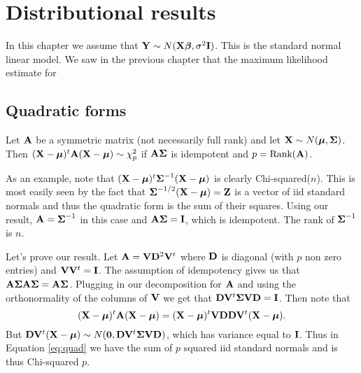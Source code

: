 \chapter{Distributional results}
In this chapter we assume that $\mathbf{Y} \sim N(\mathbf{X} \boldsymbol{\beta}, \sigma^2 \mathbf{I})$. This is the
standard normal linear model. We saw in the previous chapter that the maximum
likelihood estimate for 


\section{Quadratic forms}
\label{sec:qf}
Let $\mathbf{A}$ be a symmetric matrix (not necessarily full rank)
and let $\mathbf{X} \sim N(\boldsymbol{\mu}, \boldsymbol{\Sigma})$. Then
$(\mathbf{X} - \boldsymbol{\mu})^t \mathbf{A} (\mathbf{X} - \boldsymbol{\mu}) \sim \chi^2_{p}$ if 
$\mathbf{A} \boldsymbol{\Sigma}$ is idempotent and $p=\mbox{Rank}(\mathbf{A})$. 

As an example, note that $(\mathbf{X} - \boldsymbol{\mu})^t \boldsymbol{\Sigma}^{-1} (\mathbf{X} - \boldsymbol{\mu})$
is clearly Chi-squared($n$). This is most easily seen by the fact that
$\boldsymbol{\Sigma}^{-1/2}(\mathbf{X} - \boldsymbol{\mu}) = \mathbf{Z}$ is a vector of iid standard normals
and thus the quadratic form is the sum of their squares. Using
our result, $\mathbf{A} = \boldsymbol{\Sigma}^{-1}$ in this case and  
$\mathbf{A} \boldsymbol{\Sigma} = \mathbf{I}$, which is idempotent. The rank of $\boldsymbol{\Sigma}^{-1}$ is $n$.


Let's prove our result. Let $\mathbf{A} = \mathbf{V} \mathbf{D}^2 \mathbf{V}^t$ where $\mathbf{D}$ is diagonal (with $p$ non zero entries)
and $\mathbf{V} \mathbf{V}^t = \mathbf{I}$. The assumption of idempotency gives us that
$\mathbf{A} \boldsymbol{\Sigma} \mathbf{A} \boldsymbol{\Sigma} = \mathbf{A} \boldsymbol{\Sigma}$. Plugging in our decomposition for $\mathbf{A}$
and using the orthonormality of the columns of $\mathbf{V}$ we get that
$\mathbf{D} \mathbf{V}^t \boldsymbol{\Sigma} \mathbf{V} \mathbf{D} = \mathbf{I}$. Then note that
\begin{equation}
\label{eq:quad}
(\mathbf{X} - \boldsymbol{\mu})^t \mathbf{A} (\mathbf{X} - \boldsymbol{\mu}) = (\mathbf{X} - \boldsymbol{\mu})^t \mathbf{V} \mathbf{D}  \mathbf{D} \mathbf{V}^t (\mathbf{X} - \boldsymbol{\mu}).
\end{equation}
But $\mathbf{D} \mathbf{V}^t (\mathbf{X} - \boldsymbol{\mu}) \sim N(\mathbf{0}, \mathbf{D} \mathbf{V}^t \boldsymbol{\Sigma} \mathbf{V} \mathbf{D})$, 
which has variance equal to $\mathbf{I}$. Thus in Equation \eqref{eq:quad} we have
the sum of $p$ squared iid standard normals and is thus Chi-squared $p$. 

